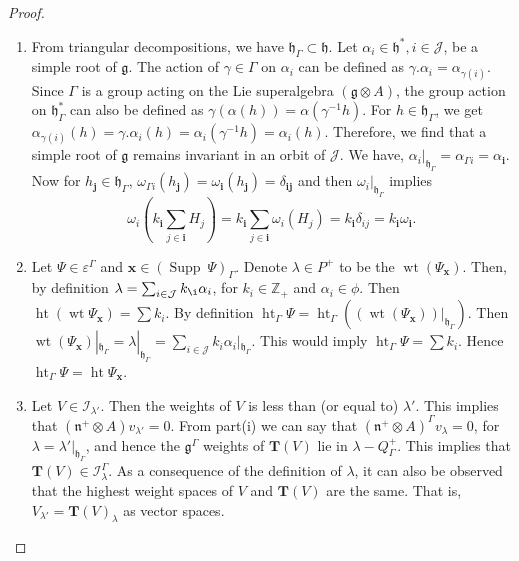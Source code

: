\documentclass[11pt]{amsart}
\theoremstyle{plain}
\theoremstyle{definition}
\newcommand{\g}{\mathfrak{g}}
\newcommand{\h}{\mathfrak{h}}
\newcommand{\n}{\mathfrak{n}}
\DeclareMathOperator{\Supp}{Supp}
\DeclareMathOperator{\het}{ht}
\DeclareMathOperator{\wt}{wt}
\begin{document}
\begin{proof}
\begin{enumerate}[label=(\alph*)]
\item 
From triangular decompositions, we have $\h_{\Gamma}\subset\h$. Let $\alpha_{i}\in\h^{*},i\in\mathcal{J}$, be a simple root of $\g$. The action of $\gamma\in\Gamma$ on $\alpha_{i}$ can be defined as $\gamma.\alpha_{i}=\alpha_{\gamma(i)}$. Since $\Gamma$ is a group acting on the Lie superalgebra $(\g\otimes A)$, the group action on $\h_{\Gamma}^{*}$ can also be defined as $\gamma(\alpha(h))=\alpha(\gamma^{-1}h)$. For $h\in\h_{\Gamma}$, we get $\alpha_{\gamma(i)}(h)=\gamma.\alpha_{i}(h)=\alpha_{i}(\gamma^{-1}h)=\alpha_{i}(h)$. Therefore, we find that a simple root of $\g$ remains invariant in an orbit of $\mathcal{J}$. We have, $\alpha_{i}|_{\h_{\Gamma}}=\alpha_{\Gamma i}=\alpha_{\textbf{i}}$. Now
for $h_{\textbf{j}}\in\h_{\Gamma}$,
$\omega_{\Gamma i}(h_{\textbf{j}})=\omega_{\textbf{i}}(h_{\textbf{j}})=\delta_{\textbf{i}\textbf{j}}$ and then $\omega_{i}|_{\h_{\Gamma}}$ implies
\begin{equation*}
\omega_{i}\left(k_{\textbf{i}}\sum_{j\in\textbf{i}}H_{j}\right)=k_{\textbf{i}}\sum_{j\in\textbf{i}}\omega_{i} (H_{j})=k_{\textbf{i}}\delta_{ij}=k_{\textbf{i}}\omega_{\textbf{i}} .
\end{equation*}
\item Let $\Psi\in\varepsilon^{\Gamma}$ and $\textbf{x}\in (\Supp\ \Psi)_{\Gamma}$. Denote $\lambda\in P^{+}$ to be the $\wt(\Psi_{\textbf{x}})$. Then, by definition $\lambda=\sum_{i\in\mathcal{J}}k_{\i}\alpha_{i}$, for $k_{i}\in\mathbb{Z}_{+}$ and $\alpha_{i}\in\phi$. Then $\het(\wt\Psi_{\textbf{x}})=\sum k_{i}$. By definition $\het_{\Gamma}\Psi=\het_{\Gamma}((\wt(\Psi_{\textbf{x}}))|_{\h_{\Gamma}})$. Then $\wt(\Psi_{\textbf{x}})|_{\h_{\Gamma}}=\lambda|_{\h_{\Gamma}}=\sum_{i\in\mathcal{J}}k_{i}\alpha_{i}|{_{\h_{\Gamma}}}$. This would imply $\het_{\Gamma}\Psi=\sum k_{i}$. Hence $\het_{\Gamma}\Psi=\het\Psi_{\textbf{x}}$. 
        \item Let $V\in\mathcal{I}_{\lambda'}$. Then the weights of $V$ is less than (or equal to) $\lambda'$. This implies that $(\n^{+}\otimes A)v_{\lambda'}=0$. From part(i) we can say that $(\n^{+}\otimes A)^{\Gamma}v_{\lambda}=0$, for $\lambda=\lambda'|_{\h_{\Gamma}}$, and hence the $\g^{\Gamma}$ weights of $\textbf{T}(V)$ lie in $\lambda-Q_{\Gamma}^{+}$. This implies that $\textbf{T}(V)\in\mathcal{I}_{\lambda}^{\Gamma}$. As a consequence of the definition of $\lambda$, it can also be observed that the highest weight spaces of $V$ and $\textbf{T}(V)$ are the same. That is, $V_{\lambda'}=\textbf{T}(V)_{\lambda}$ as vector spaces.
    \end{enumerate}
\end{proof}
\end{document}
